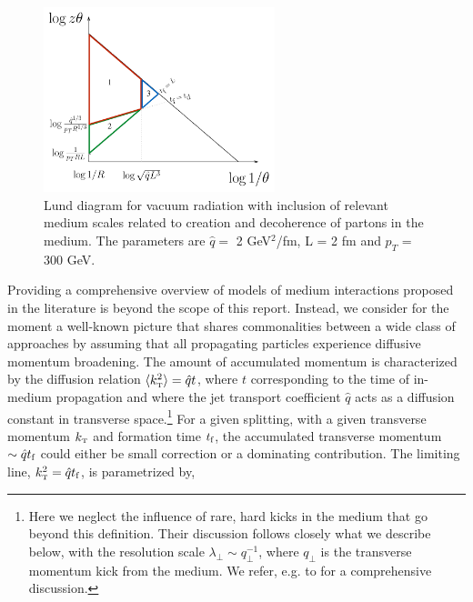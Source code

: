 \begin{figure}
\centering
\includegraphics[width=0.6\textwidth]{figures/kinematics/LundDiagram_details_cropped}%
\caption{Lund diagram for vacuum radiation with inclusion of relevant medium scales related to creation and decoherence of partons in the medium. The parameters are $\hat q = $ 2 GeV$^2$/fm, L = 2 fm and $p_{\scriptscriptstyle T}$ = 300 GeV. 
}
\label{fig:PS1}
\end{figure}
Providing a comprehensive overview of models of medium interactions proposed in the literature is beyond the scope of this report. Instead, we consider for the moment a well-known picture that shares commonalities between a wide class of approaches by assuming that all propagating particles experience diffusive momentum broadening. The amount of accumulated momentum is characterized by the diffusion relation $\langle k_{\text{\tiny T}}^2 \rangle = \hat q t$, where $t$ corresponding to the time of in-medium propagation and where the jet transport coefficient $\hat q$ acts as a diffusion constant in transverse space.\footnote{Here we neglect the influence of rare, hard kicks in the medium that go beyond this definition. Their discussion follows closely what we describe below, with the resolution scale $\lambda_\perp \sim q_\perp^{-1}$, where $q_\perp$ is the transverse momentum kick from the medium. We refer, e.g. to \cite{Kurkela:2014tla} for a comprehensive discussion.} 
For a given splitting, with a given transverse momentum $k_{\text{\tiny T}}$ and formation time $t_\text{f}$, the accumulated transverse momentum $\sim \hat q t_\text{f}$ could either be small correction or a dominating contribution. The limiting line, $k_{\text{\tiny T}}^2 = \hat q t_\text{f}$, is parametrized by,
